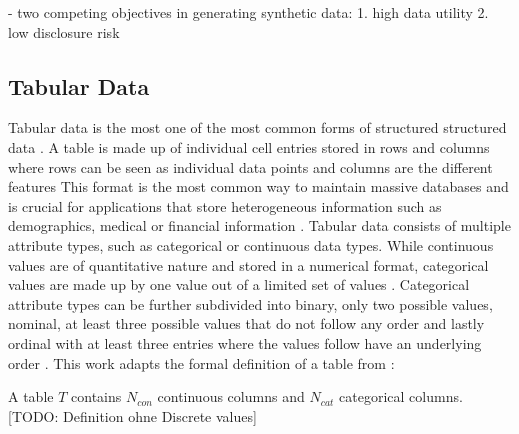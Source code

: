 
- two competing objectives in generating synthetic data: \cite{little2021GenerativeAdversarialNetworksa}
    1. high data utility \cite{little2021GenerativeAdversarialNetworksa}
    2. low disclosure risk \cite{little2021GenerativeAdversarialNetworksa}


\subsection{Tabular Data}
\label{ch:preliminaries-dataSynthesis-tabularData}

Tabular data is the most one of the most common forms of structured structured data \cite{hernandez2022SyntheticDataGeneration}.
A table is made up of individual cell entries stored in rows and columns where rows can be seen as individual data points and columns are the different features \cite{borisov2022DeepNeuralNetworks, yoon2020VIMEExtendingSuccess}
This format is the most common way to maintain massive databases \cite{esmaeilpour2022BidiscriminatorGANTabular, yoon2020VIMEExtendingSuccess} 
and is crucial for applications that store heterogeneous information such as demographics, medical or financial information \cite{borisov2022DeepNeuralNetworks, yoon2020VIMEExtendingSuccess}.
Tabular data consists of multiple attribute types, such as categorical or continuous data types\cite{borisov2022DeepNeuralNetworks}.
While continuous values are of quantitative nature and stored in a numerical format, categorical values are made up by one value out of a limited set of values \cite{lederrey2022DATGANIntegratingExperta, lane2003IntroductionStatistics}.
Categorical attribute types can be further subdivided into binary, only two possible values, nominal, at least three possible values that do not follow any order and lastly ordinal with at least three entries where the values follow have an underlying order \cite{lederrey2022DATGANIntegratingExperta}.
This work adapts the formal definition of a table from \cite{xu2019ModelingTabularData}:

\begin{displayquote}
A table $T$ contains $N_{con}$ continuous columns and $N_{cat}$ categorical columns. [TODO: Definition ohne Discrete values]
\end{displayquote}

